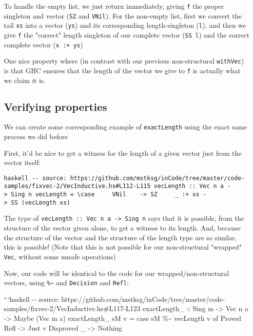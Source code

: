 \documentclass[]{article}
\begin{document}
To handle the empty list, we just return immediately, giving \texttt{f} the
proper singleton and vector (\texttt{SZ} and \texttt{VNil}). For the non-empty
list, first we convert the tail \texttt{xs} into a vector (\texttt{ys}) and its
corresponding length-singleton (\texttt{l}), and then we give \texttt{f} the
"correct" length singleton of our complete vector (\texttt{SS\ l}) and the
correct complete vector (\texttt{x\ :+\ ys})

One nice property where (in contrast with our previous non-structural
\texttt{withVec}) is that GHC ensures that the length of the vector we give to
\texttt{f} is actually what we claim it is.

\subsection{Verifying properties}

We can create some corresponding example of \texttt{exactLength} using the exact
same process we did before

First, it'd be nice to get a witness for the length of a given vector just from
the vector itself:

\texttt{haskell\ -\/-\ source:\ https://github.com/mstksg/inCode/tree/master/code-samples/fixvec-2/VecInductive.hs\#L112-L115\ vecLength\ ::\ Vec\ n\ a\ -\textgreater{}\ Sing\ n\ vecLength\ =\ \textbackslash{}case\ \ \ \ \ VNil\ \ \ \ -\textgreater{}\ SZ\ \ \ \ \ \_\ :+\ xs\ -\textgreater{}\ SS\ (vecLength\ xs)}

The type of \texttt{vecLength\ ::\ Vec\ n\ a\ -\textgreater{}\ Sing\ n} says
that it is possible, from the structure of the vector given alone, to get a
witness to its length. And, because the structure of the vector and the
structure of the length type are so similar, this is possible! (Note that this
is not possible for our non-structural "wrapped" \texttt{Vec}, without some
unsafe operations)

Now, our code will be identical to the code for our wrapped/non-structural
vectors, using \texttt{\%\textasciitilde{}} and \texttt{Decision} and
\texttt{Refl}:

```haskell -\/- source:
https://github.com/mstksg/inCode/tree/master/code-samples/fixvec-2/VecInductive.hs\#L117-L123
exactLength\_ :: Sing m -\textgreater{} Vec n a -\textgreater{} Maybe (Vec m a)
exactLength\_ sM v = case sM \%\textasciitilde{} vecLength v of Proved Refl
-\textgreater{} Just v Disproved \_ -\textgreater{} Nothing
\end{document}
